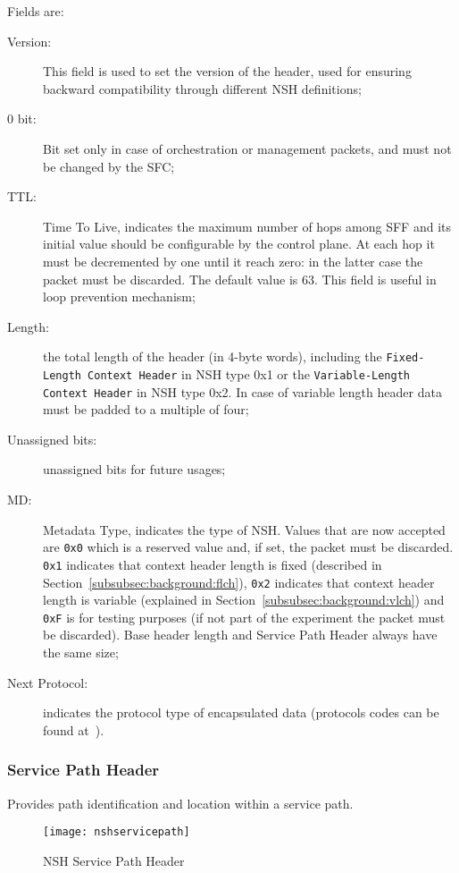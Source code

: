 Fields are:
\begin{description}
  \item[Version:] This field is used to set the version of the header, used for
  ensuring backward compatibility through different NSH definitions;
  \item[0 bit:] Bit set only in case of orchestration or management packets, and
  must not be changed by the SFC;
  \item[TTL:] Time To Live, indicates the maximum number of hops among SFF and
  its initial value should be configurable by the control plane. At each hop it
  must be decremented by one until it reach zero: in the latter case the packet
  must be discarded. The default value is $63$. This field is useful in loop
  prevention mechanism;
  \item[Length:] the total length of the header (in 4-byte words), including
  the \texttt{Fixed-Length Context Header} in NSH type 0x1 or the
  \texttt{Variable-Length Context Header} in NSH type 0x2. In case of variable
  length header data must be padded to a multiple of four;
  \item[Unassigned bits:] unassigned bits for future usages;
  \item[MD:] Metadata Type, indicates the type of NSH. Values that are now
  accepted are \texttt{0x0} which is a reserved value and, if set, the packet
  must be discarded. \texttt{0x1} indicates that context header length is
  fixed (described in Section~\ref{subsubsec:background:flch}), \texttt{0x2}
  indicates that context header length is variable (explained in
  Section~\ref{subsubsec:background:vlch}) and \texttt{0xF} is for testing
  purposes (if not part of the experiment the packet must be discarded).
  Base header length and Service Path Header always have the same size;
  \item[Next Protocol:] indicates the protocol type of encapsulated data
  (protocols codes can be found at~\cite{rfc8300}).
\end{description}

\subsubsection{Service Path Header}
Provides path identification and location within a service path.

\begin{figure}[H]
  \centering
  \texttt{[image: nshservicepath]}
  \caption[NSH Service Path Header]{NSH Service Path Header~\cite{rfc8300}}
  \label{chap:background:img:nshpath}
\end{figure}

